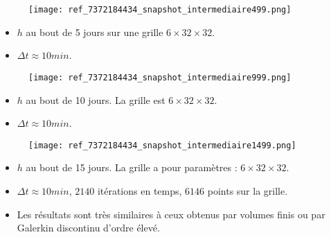 \documentclass[11pt]{beamer}
\begin{document}


\begin{frame}{}
\begin{figure}
\texttt{[image: ref\_7372184434\_snapshot\_intermediaire499.png]}
\end{figure}
\begin{itemize}
\item $h$ au bout de 5 jours sur une grille $6 \times 32 \times 32$.
\item $\Delta t \approx 10min$.
\end{itemize}
\end{frame}



\begin{frame}{}
\begin{figure}
\texttt{[image: ref\_7372184434\_snapshot\_intermediaire999.png]}
\end{figure}
\begin{itemize}
\item $h$ au bout de 10 jours. La grille est $6 \times 32 \times 32$.
\item $\Delta t \approx 10min$.
\end{itemize}
\end{frame}



\begin{frame}{}
\begin{figure}
\texttt{[image: ref\_7372184434\_snapshot\_intermediaire1499.png]}
\end{figure}
\begin{itemize}
\item $h$ au bout de 15 jours. La grille a pour paramètres : $6 \times 32 \times 32$.
\item $\Delta t \approx 10min$, $2140$ itérations en temps, $6146$ points sur la grille.
\item Les résultats sont très similaires à ceux obtenus par volumes finis ou par Galerkin discontinu d'ordre élevé.
\end{itemize}
\end{frame}
\end{document}
